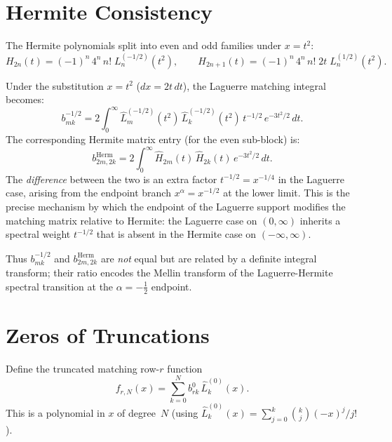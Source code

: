 \documentclass[11pt,a4paper]{article}
\theoremstyle{definition}
\theoremstyle{plain}
\begin{document}
\section{Hermite Consistency}

The Hermite polynomials split into even and odd families under $x=t^2$:
\begin{equation}\label{eq:hermite-laguerre}
  H_{2n}(t) = (-1)^n\,4^n\,n!\;L_n^{(-1/2)}(t^2),
  \qquad
  H_{2n+1}(t) = (-1)^n\,4^n\,n!\;2t\;L_n^{(1/2)}(t^2).
\end{equation}

\noindent Under the substitution $x=t^2$ ($dx=2t\,dt$), the Laguerre
matching integral becomes:
\begin{equation}
  b_{mk}^{-1/2}
  = 2\int_0^\infty \hat{L}_m^{(-1/2)}(t^2)\,\hat{L}_k^{(-1/2)}(t^2)\,
    t^{-1/2}\,e^{-3t^2/2}\,dt.
\end{equation}
The corresponding Hermite matrix entry (for the even sub-block) is:
\begin{equation}
  b_{2m,2k}^{\mathrm{Herm}}
  = 2\int_0^\infty \hat{H}_{2m}(t)\,\hat{H}_{2k}(t)\,e^{-3t^2/2}\,dt.
\end{equation}
The \emph{difference} between the two is an extra factor $t^{-1/2}=x^{-1/4}$
in the Laguerre case, arising from the endpoint branch $x^\alpha = x^{-1/2}$
at the lower limit. This is the precise mechanism by which the endpoint
of the Laguerre support modifies the matching matrix relative to Hermite:
the Laguerre case on $(0,\infty)$ inherits a spectral weight $t^{-1/2}$
that is absent in the Hermite case on $(-\infty,\infty)$.

Thus $b^{-1/2}_{mk}$ and $b^{\mathrm{Herm}}_{2m,2k}$ are \emph{not} equal
but are related by a definite integral transform; their ratio encodes the
Mellin transform of the Laguerre-Hermite spectral transition at the
$\alpha=-\tfrac12$ endpoint.

\section{Zeros of Truncations}

Define the truncated matching row-$r$ function
\[
  f_{r,N}(x) = \sum_{k=0}^N b_{rk}^0\,\hat{L}_k^{(0)}(x).
\]
This is a polynomial in $x$ of degree~$N$ (using
$\hat{L}_k^{(0)}(x) = \sum_{j=0}^k\binom{k}{j}(-x)^j/j!$).
\end{document}
